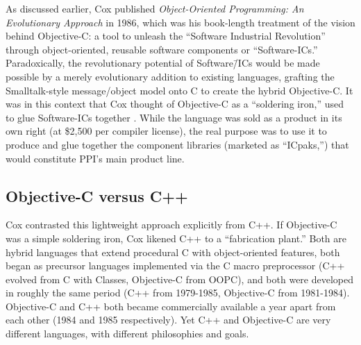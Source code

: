 \documentclass[acmsmall,screen]{acmart}
\begin{document}
As discussed earlier, Cox published \emph{Object-Oriented Programming: An Evolutionary Approach} in 1986, which was his book-length treatment of the vision behind Objective-C: a tool to unleash the ``Software Industrial Revolution'' through object-oriented, reusable software components or ``Software-ICs.''  \citep{cox_object-oriented_1986} Paradoxically, the revolutionary potential of Software\=/ICs would be made possible by a merely evolutionary addition to existing languages, grafting the Smalltalk-style message/object model onto C to create the hybrid Objective-C. It was in this context that Cox thought of Objective-C as a ``soldering iron,'' used to glue Software-ICs together \citep[260]{biancuzzi_objective-c_2009}. While the language was sold as a product in its own right (at \$2,500 per compiler license), the real purpose was to use it to produce and glue together the component libraries (marketed as ``ICpaks,'') that would constitute PPI's main product line.
\subsection{Objective-C versus C++}
\label{subsec-ObjCvC++}
Cox contrasted this lightweight approach explicitly from C++. If Objective-C was a simple soldering iron, Cox likened C++ to a ``fabrication plant.'' \citetext{\citealp[29--30]{cox_oral_2016}, \citealp[263]{biancuzzi_objective-c_2009}}  Both are hybrid languages that extend procedural C with object-oriented features, both began as precursor languages implemented via the C macro preprocessor (C++ evolved from C with Classes, Objective-C from OOPC), and both were developed in roughly the same period (C++ from 1979-1985, Objective-C from 1981-1984). Objective-C and C++ both became commercially available a year apart from each other (1984 and 1985 respectively). Yet C++ and Objective-C are very different languages, with different philosophies and goals. 
\end{document}
